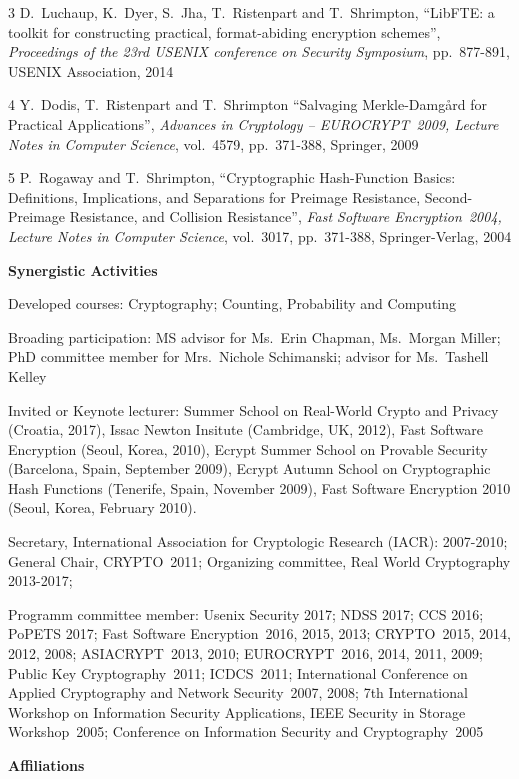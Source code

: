 \documentclass{article}[11pt]
\newcommand{\drop}{\protect{\vspace{1.2ex}}}
\newlength{\headwidth}
\newlength{\sepwidth}
\newlength{\itemwidth}
\newcommand{\resitem}[2]{\noindent\vspace{.15in}\parbox[t]{\headwidth}{\bf{#1}}\hspace{\sepwidth}\parbox[t]{\itemwidth}{#2}}
\newcommand{\pf}{\it}
\begin{document}
\begin{noindent}
{\drop
\num{3}
D.\ Luchaup, K.\ Dyer, S.\ Jha, T.\ Ristenpart and T.\ Shrimpton,
``LibFTE: a toolkit for constructing practical, format-abiding
encryption schemes'',
{\pf Proceedings of the 23rd USENIX conference on Security Symposium},
pp.\ 877-891, {USENIX Association}, 2014


\drop
\num{4} Y.\ Dodis, T.\ Ristenpart and T.\ Shrimpton
``Salvaging Merkle-Damg{\aa}rd for Practical Applications'',
{\pf Advances in
Cryptology -- EUROCRYPT~2009, Lecture Notes in Computer Science}, vol.\
4579, pp.\ 371-388, Springer, 2009


\drop
\num{5}
P.\ Rogaway and T.\ Shrimpton, ``Cryptographic Hash-Function Basics:
Definitions, Implications, and Separations for Preimage Resistance,
Second-Preimage Resistance, and Collision Resistance'', {\pf  Fast
Software Encryption~2004, Lecture Notes in Computer Science}, vol.\
3017, pp.\ 371-388, Springer-Verlag, 2004

}


\resitem{Synergistic Activities}{ 
Developed courses: Cryptography; Counting, Probability and Computing

\drop
Broading participation: MS advisor for Ms.\ Erin Chapman, Ms.\ Morgan Miller; PhD committee member for Mrs.\ Nichole Schimanski; advisor for Ms.\ Tashell Kelley

\drop
Invited or Keynote lecturer: Summer School on Real-World Crypto and
Privacy (Croatia, 2017), Issac Newton Insitute (Cambridge, UK, 2012), Fast Software Encryption (Seoul, Korea, 2010), Ecrypt Summer School on Provable Security (Barcelona, Spain, September 2009), Ecrypt Autumn School on Cryptographic Hash Functions (Tenerife, Spain, November 2009), Fast Software Encryption 2010 (Seoul, Korea, February 2010).

\drop
Secretary, International Association for Cryptologic Research (IACR): 2007-2010;
General Chair, CRYPTO~2011;
Organizing committee, Real World Cryptography 2013-2017;

Programm committee member:
Usenix Security 2017;
NDSS 2017;
CCS 2016;
PoPETS 2017;
Fast Software Encryption~2016, 2015, 2013;
CRYPTO~2015, 2014, 2012, 2008;
ASIACRYPT~2013, 2010;
EUROCRYPT~2016, 2014, 2011, 2009;
Public Key Cryptography~2011;
ICDCS~2011;
International Conference on Applied Cryptography and Network
Security~2007, 2008;  
7th International Workshop on Information Security Applications, 
IEEE Security in Storage Workshop~2005;
Conference on Information Security and Cryptography~2005
}

\resitem{Affiliations}{

}
\end{noindent}
\end{document}
